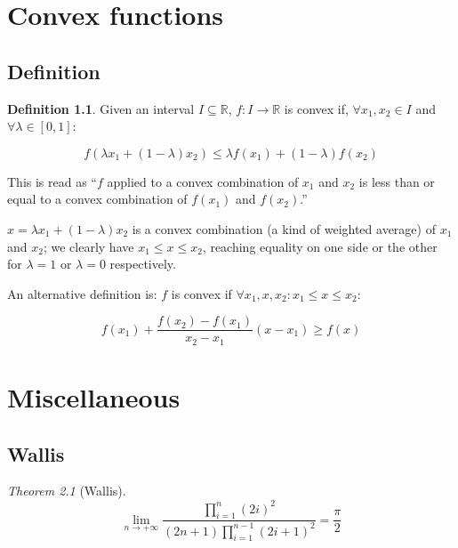 \documentclass[12pt,a4paper]{report}
\numberwithin{equation}{section}
\theoremstyle{definition}
\newtheorem{definition}{Definition}[section]
\theoremstyle{remark}
\newtheorem{theorem}{Theorem}[section]
\begin{document}
\chapter{Convex functions}

\section{Definition}

\begin{definition}
Given an interval $I \subseteq \mathbb{R}$, $f: I\rightarrow \mathbb{R}$ is convex if, $\forall x_1, x_2 \in I$ and $\forall \lambda \in [0, 1]$:

\begin{equation}
f(\lambda x_1 + (1-\lambda) x_2) \leq \lambda f(x_1) + (1-\lambda)f(x_2)
\end{equation}

This is read as ``$f$ applied to a convex combination of $x_1$ and $x_2$ is less than or equal to a convex combination of $f(x_1)$ and $f(x_2)$.''
\end{definition}

$x = \lambda x_1 + (1-\lambda) x_2$ is a convex combination (a kind of weighted average) of $x_1$ and $x_2$; we clearly have $x_1 \leq x \leq x_2$, reaching equality on one side or the other for $\lambda = 1$ or $\lambda = 0$ respectively.

An alternative definition is: $f$ is convex if $\forall x_1, x, x_2: x_1 \leq x \leq x_2$:

\begin{equation}
f(x_1) + \frac{f(x_2) - f(x_1)}{x_2 - x_1}(x - x_1) \geq f(x)
\end{equation}


\chapter{Miscellaneous}

\section{Wallis}

\begin{theorem}[Wallis]
\begin{equation}
\lim_{n\rightarrow +\infty} \frac{\displaystyle\prod_{i=1}^{n} (2i)^2}{(2n+1)\displaystyle \prod _{i=1}^{n-1} (2i+1)^2}  = \frac{\pi}{2}
\end{equation}
\end{theorem}
\end{document}
